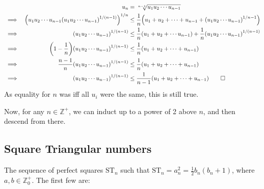 \documentclass[fleqn,a4paper,11pt]{article}
\begin{document}
    \begin{alignat*}{2}
    &&u_n &= \sqrt[n - 1]{u_1 u_2 \dotsm u_{n - 1}} \\
    &\implies& \pqty{u_1 u_2 \dotsm u_{n - 1}
                \pqty{u_1 u_2 \dotsm u_{n - 1}}^{1 / (n - 1)}}^{1 / n}
             &\le \frac 1n \pqty{u_1 + u_2 + \dotsb  + u_{n - 1} +
                \pqty{u_1 u_2 \dotsm u_{n - 1}}^{1/{n - 1}}} \\
    &\implies& \pqty{u_1 u_2 \dotsm u_{n - 1}}^{1 / (n - 1)} &\le
             \frac 1n \pqty{u_1 + u_2 + \dotsb u_{n - 1}} +
             \frac 1n \pqty{u_1 u_2 \dotsm u_{n - 1}}^{1 / (n - 1)} \\
    &\implies& \pqty{1 - \frac 1n}
             \pqty{u_1 u_2 \dotsm u_{n - 1}}^{1 / (n - 1)} &\le
             \frac 1n \pqty{u_1 + u_2 + \dotsb + u_{n - 1}} \\
    &\implies& \frac {n - 1}n
             \pqty{u_1 u_2 \dotsb u_{n - 1}}^{1 / (n - 1)} &\le
             \frac 1n \pqty{u_1 + u_2 + \dotsb + u_{n - 1}} \\
    &\implies& \pqty{u_1 u_2 \dotsm u_{n - 1}}^{1 / (n - 1)} &\le
             \frac 1{n - 1} \pqty{u_1 + u_2 + \dotsb + u_{n - 1}} \qed
    \end{alignat*}
    As equality for \(n\) was iff all \(u_i\) were the same, this is still true.

    Now, for any \(n \in \mathbb{Z}^+\), we can induct up to a power of 2 above
    \(n\), and then descend from there.

    \subsection{Square Triangular numbers}


    The sequence of perfect squares \(\mathrm{ST}_n\) such that
    \(\mathrm{ST}_n= a_n^2 = \frac 12 b_n(b_n + 1)\), where
    \(a, b \in \mathbb{Z}_0^+\). The first few are:
\end{document}
